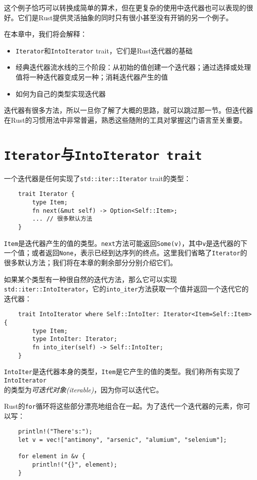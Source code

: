 这个例子恰巧可以转换成简单的算术，但在更复杂的使用中迭代器也可以表现的很好。它们是Rust提供灵活抽象的同时只有很小甚至没有开销的另一个例子。

在本章中，我们将会解释：
\begin{itemize}
    \item \texttt{Iterator}和\texttt{IntoIterator} trait，它们是Rust迭代器的基础
    \item 经典迭代器流水线的三个阶段：从初始的值创建一个迭代器；通过选择或处理值将一种迭代器变成另一种；消耗迭代器产生的值
    \item 如何为自己的类型实现迭代器
\end{itemize}

迭代器有很多方法，所以一旦你了解了大概的思路，就可以跳过那一节。但迭代器在Rust的习惯用法中非常普遍，熟悉这些随附的工具对掌握这门语言至关重要。

\section{\texttt{Iterator}与\texttt{IntoIterator trait}}\label{iter}

一个迭代器是任何实现了\texttt{std::iter::Iterator} trait的类型：
\begin{verbatim}
    trait Iterator {
        type Item;
        fn next(&mut self) -> Option<Self::Item>;
        ... // 很多默认方法
    }
\end{verbatim}

\texttt{Item}是迭代器产生的值的类型。\texttt{next}方法可能返回\texttt{Some(v)}，其中\texttt{v}是迭代器的下一个值；或者返回\texttt{None}，表示已经到达序列的终点。这里我们省略了\texttt{Iterator}的很多默认方法；我们将在本章的剩余部分分别介绍它们。

如果某个类型有一种很自然的迭代方法，那么它可以实现\texttt{std::iter::IntoIterator}，它的\texttt{into\_iter}方法获取一个值并返回一个迭代它的迭代器：
\begin{verbatim}
    trait IntoIterator where Self::IntoIter: Iterator<Item=Self::Item> {
        type Item;
        type IntoIter: Iterator;
        fn into_iter(self) -> Self::IntoIter;
    }
\end{verbatim}

\texttt{IntoIter}是迭代器本身的类型，\texttt{Item}是它产生的值的类型。我们称所有实现了\texttt{IntoIterator}\\
的类型为\emph{可迭代对象(iterable)}，因为你可以迭代它。

Rust的\texttt{for}循环将这些部分漂亮地组合在一起。为了迭代一个迭代器的元素，你可以写：
\begin{verbatim}
    println!("There's:");
    let v = vec!["antimony", "arsenic", "alumium", "selenium"];

    for element in &v {
        println!("{}", element);
    }
\end{verbatim}


